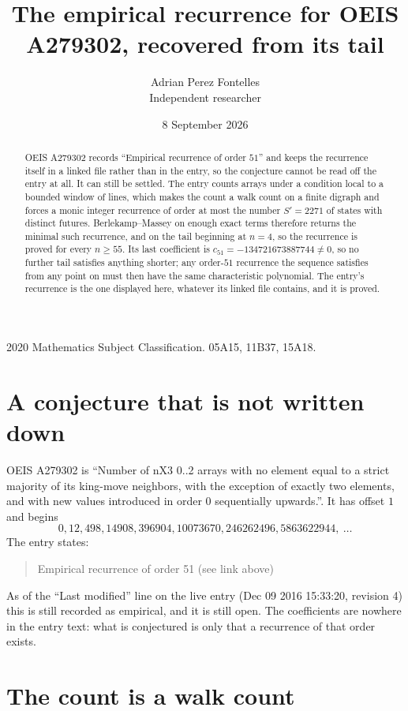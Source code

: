 \documentclass[11pt,a4paper]{article}
\title{The empirical recurrence for OEIS A279302, recovered from its tail}
\author{Adrian Perez Fontelles\\ \small Independent researcher}
\date{8 September 2026}
\theoremstyle{plain}
\theoremstyle{definition}
\begin{document}
\maketitle

\begin{abstract}
OEIS A279302 records ``Empirical recurrence of order $51$'' and keeps the recurrence itself in
a linked file rather than in the entry, so the conjecture cannot be read off the entry at all.
It can still be settled. The entry counts arrays under a condition local to a bounded window of
lines, which makes the count a walk count on a finite digraph and forces a monic integer
recurrence of order at most the number $S'=2271$ of states with distinct futures. Berlekamp--Massey on
enough exact terms therefore returns the minimal such recurrence, and on the tail beginning at $n=4$, so the recurrence is proved for every $n\ge55$.
Its last coefficient is $c_{51}=-134721673887744\neq0$, so no further tail satisfies anything
shorter; any order-$51$ recurrence the sequence satisfies from any point on must then have
the same characteristic polynomial. The entry's recurrence is the one displayed here, whatever
its linked file contains, and it is proved.
\end{abstract}

\noindent\small 2020 Mathematics Subject Classification. 05A15, 11B37, 15A18.\normalsize

\section{A conjecture that is not written down}

OEIS A279302 is ``Number of nX3 0..2 arrays with no element equal to a strict majority of its king-move neighbors, with the exception of exactly two elements, and with new values introduced in order 0 sequentially upwards.''. It has offset $1$ and begins
\[
0, 12, 498, 14908, 396904, 10073670, 246262496, 5863622944,\ \dots
\]
The entry states:
\begin{quote}
Empirical recurrence of order 51 (see link above)
\end{quote}
As of the ``Last modified'' line on the live entry (Dec 09 2016 15:33:20, revision 4)
this is still recorded as empirical, and it is still open. The coefficients are nowhere in the
entry text: what is conjectured is only that a recurrence of that order exists.

\section{The count is a walk count}
\end{document}
